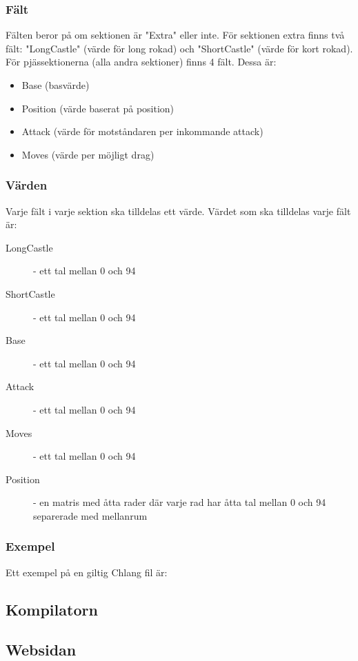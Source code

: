 \documentclass{article}
\begin{document}
	\subsubsection{Fält}
	Fälten beror på om sektionen är "Extra" eller inte.
	För sektionen extra finns två fält: "LongCastle" (värde för long rokad) och "ShortCastle" (värde för kort rokad). För pjässektionerna (alla andra sektioner) finns 4 fält. Dessa är:
\begin{itemize}
\item Base (basvärde)
\item Position (värde baserat på position)
\item Attack (värde för motståndaren per inkommande attack)
\item Moves (värde per möjligt drag)
\end{itemize}

\subsubsection{Värden}
Varje fält i varje sektion ska tilldelas ett värde. Värdet som ska tilldelas varje fält är:
\begin{description}
\item [LongCastle] - ett tal mellan 0 och 94
\item [ShortCastle] - ett tal mellan 0 och 94
\item [Base] - ett tal mellan 0 och 94
\item [Attack] - ett tal mellan 0 och 94 
\item [Moves] - ett tal mellan 0 och 94
\item [Position] - en matris med åtta rader där varje rad har åtta tal mellan 0 och 94 separerade med mellanrum
\end{description}

\subsubsection{Exempel}
Ett exempel på en giltig Chlang fil är:
 


	
	\subsection{Kompilatorn}
	\subsection{Websidan}
\end{document}
